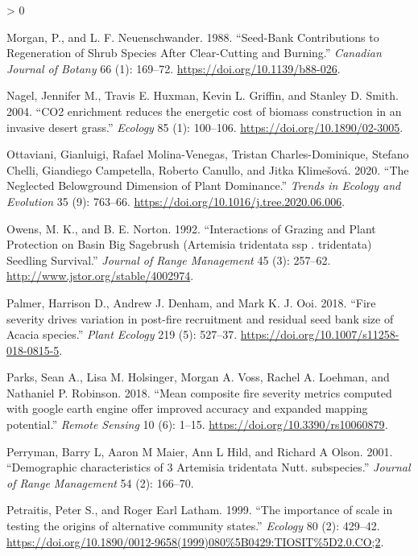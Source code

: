 \documentclass[
  12pt,
]{article}
\newlength{\cslhangindent}
\newenvironment{CSLReferences}[2] %
 {%
  \setlength{\parindent}{0pt}
  \ifodd #1 \everypar{\setlength{\hangindent}{\cslhangindent}}\ignorespaces\fi
  \ifnum #2 > 0
  \setlength{\parskip}{#2\baselineskip}
  \fi
 }%
 {}
\begin{document}
\begin{CSLReferences}{1}{0}
\leavevmode\hypertarget{ref-Morgan1988}{}%
Morgan, P., and L. F. Neuenschwander. 1988. {``Seed-Bank Contributions
to Regeneration of Shrub Species After Clear-Cutting and Burning.''}
\emph{Canadian Journal of Botany} 66 (1): 169--72.
\url{https://doi.org/10.1139/b88-026}.

\leavevmode\hypertarget{ref-Nagel2004}{}%
Nagel, Jennifer M., Travis E. Huxman, Kevin L. Griffin, and Stanley D.
Smith. 2004. {``{CO2 enrichment reduces the energetic cost of biomass
construction in an invasive desert grass}.''} \emph{Ecology} 85 (1):
100--106. \url{https://doi.org/10.1890/02-3005}.

\leavevmode\hypertarget{ref-Ottaviani2020}{}%
Ottaviani, Gianluigi, Rafael Molina-Venegas, Tristan Charles-Dominique,
Stefano Chelli, Giandiego Campetella, Roberto Canullo, and Jitka
Klimešová. 2020. {``{The Neglected Belowground Dimension of Plant
Dominance}.''} \emph{Trends in Ecology and Evolution} 35 (9): 763--66.
\url{https://doi.org/10.1016/j.tree.2020.06.006}.

\leavevmode\hypertarget{ref-Owens1992}{}%
Owens, M. K., and B. E. Norton. 1992. {``{Interactions of Grazing and
Plant Protection on Basin Big Sagebrush (Artemisia tridentata ssp .
tridentata) Seedling Survival}.''} \emph{Journal of Range Management} 45
(3): 257--62. \url{http://www.jstor.org/stable/4002974}.

\leavevmode\hypertarget{ref-Palmer2018}{}%
Palmer, Harrison D., Andrew J. Denham, and Mark K. J. Ooi. 2018.
{``{Fire severity drives variation in post-fire recruitment and residual
seed bank size of Acacia species}.''} \emph{Plant Ecology} 219 (5):
527--37. \url{https://doi.org/10.1007/s11258-018-0815-5}.

\leavevmode\hypertarget{ref-Parks2018}{}%
Parks, Sean A., Lisa M. Holsinger, Morgan A. Voss, Rachel A. Loehman,
and Nathaniel P. Robinson. 2018. {``{Mean composite fire severity
metrics computed with google earth engine offer improved accuracy and
expanded mapping potential}.''} \emph{Remote Sensing} 10 (6): 1--15.
\url{https://doi.org/10.3390/rs10060879}.

\leavevmode\hypertarget{ref-Perryman2001}{}%
Perryman, Barry L, Aaron M Maier, Ann L Hild, and Richard A Olson. 2001.
{``{Demographic characteristics of 3 Artemisia tridentata Nutt.
subspecies}.''} \emph{Journal of Range Management} 54 (2): 166--70.

\leavevmode\hypertarget{ref-Petraitis1999}{}%
Petraitis, Peter S., and Roger Earl Latham. 1999. {``{The importance of
scale in testing the origins of alternative community states}.''}
\emph{Ecology} 80 (2): 429--42.
\url{https://doi.org/10.1890/0012-9658(1999)080\%5B0429:TIOSIT\%5D2.0.CO;2}.


\end{CSLReferences}
\end{document}
